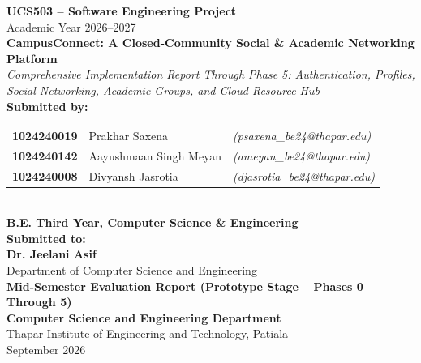 \documentclass[12pt, a4paper, oneside]{report}
\begin{document}
\begin{titlepage}
    \centering
    \vspace*{0.3cm}
    
    {\Large\bfseries UCS503 -- Software Engineering Project}\\[0.25cm]
    {\large Academic Year 2026--2027}\\[1.2cm]
    
    {\huge\bfseries CampusConnect: A Closed-Community Social \& Academic Networking Platform}\\[0.4cm]
    {\large\textit{Comprehensive Implementation Report Through Phase 5: Authentication, Profiles, Social Networking, Academic Groups, and Cloud Resource Hub}}\\[1.8cm]
    
    {\large\textbf{Submitted by:}}\\[0.35cm]
    \begin{tabular}{lll}
        \textbf{1024240019} & Prakhar Saxena & \textit{(psaxena\_be24@thapar.edu)} \\
        \textbf{1024240142} & Aayushmaan Singh Meyan & \textit{(ameyan\_be24@thapar.edu)} \\
        \textbf{1024240008} & Divyansh Jasrotia & \textit{(djasrotia\_be24@thapar.edu)} \\
    \end{tabular}\\[0.5cm]
    {\normalsize\textbf{B.E. Third Year, Computer Science \& Engineering}}\\[1.6cm]
    
    {\large\textbf{Submitted to:}}\\[0.2cm]
    {\large\textbf{Dr. Jeelani Asif}}\\[0.1cm]
    {\normalsize Department of Computer Science and Engineering}\\[1.2cm]
    
    \vfill
    {\normalsize\textbf{Mid-Semester Evaluation Report (Prototype Stage -- Phases 0 Through 5)}}\\[0.15cm]
    {\normalsize\textbf{Computer Science and Engineering Department}}\\[0.1cm]
    {\normalsize Thapar Institute of Engineering and Technology, Patiala}\\[0.4cm]
    {\small September 2026}
\end{titlepage}
\end{document}
